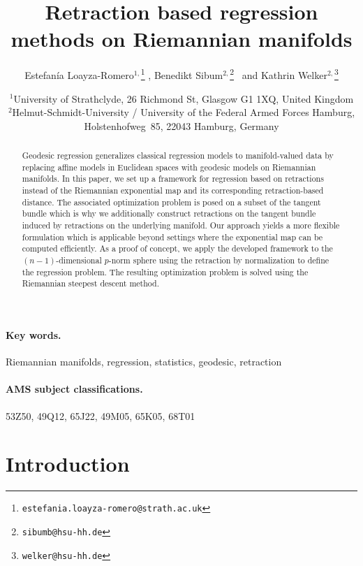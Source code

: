 \documentclass[11pt,a4paper]{article}
\title{Retraction based regression methods on Riemannian manifolds}
\author{Estefanía Loayza-Romero$^{1,}$\footnote{\texttt{estefania.loayza-romero@strath.ac.uk}} , Benedikt Sibum$^{2,}$\footnote{\texttt{sibumb@hsu-hh.de}} \, and Kathrin Welker$^{2,}$\footnote{\texttt{welker@hsu-hh.de}} }
\date{\small $^1$University of Strathclyde, 26 Richmond St, Glasgow G1 1XQ, United Kingdom\\[4pt]\small $^2$Helmut-Schmidt-University / University of the Federal Armed Forces Hamburg,\\ Holstenhofweg~85, 22043 Hamburg, Germany}
\theoremstyle{plain}
\theoremstyle{definition}
\begin{document}
\maketitle

\begin{abstract}
	Geodesic regression generalizes classical regression models to manifold-valued data by replacing affine models in Euclidean spaces with geodesic models on Riemannian manifolds. In this paper, we set up a framework for regression based on retractions instead of the Riemannian exponential map and its corresponding retraction-based distance. The associated optimization problem is posed on a subset of the tangent bundle which is why we additionally construct retractions on the tangent bundle induced by retractions on the underlying manifold. Our approach yields a more flexible formulation which is applicable beyond settings where the exponential map can be computed efficiently. As a proof of concept, we apply the developed framework to the $(n-1)$-dimensional $p$-norm sphere using the retraction by normalization to define the regression problem. The resulting optimization problem is solved using the Riemannian steepest descent method. 
\end{abstract}

\paragraph{Key words.}
Riemannian manifolds,
regression,
statistics,
geodesic,
retraction

\paragraph{AMS subject classifications.} 
53Z50,   %
49Q12,   %
65J22,    %
49M05,  %
65K05,    %
68T01     %



\section{Introduction}
\end{document}
